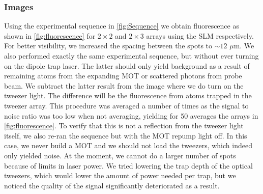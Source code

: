 \subsubsection*{Images}

Using the experimental sequence in \cref{fig:Sequence} we obtain fluorescence as shown in \cref{fig:fluorescence} for $2\times2$ and $2\times3$ arrays using the SLM respectively.
For better visibility, we increased the spacing between the spots to $\sim 12$ $\mu$m.
We also performed exactly the same experimental sequence, but without ever turning on the dipole trap laser. 
The latter should only yield background as a result of remaining atoms from the expanding MOT or scattered photons from probe beam.
We subtract the latter result from the image where we do turn on the tweezer light.
The difference will be the fluorescence from atoms trapped in the tweezer array. 
This procedure was averaged a number of times as the signal to noise ratio was too low when not averaging, yielding for 50 averages the arrays in \cref{fig:fluorescence}.
To verify that this is not a reflection from the tweezer light itself, we also re-ran the sequence but with the MOT repump light off.
In this case, we never build a MOT and we should not load the tweezers, which indeed only yielded noise.
At the moment, we cannot do a larger number of spots because of limits in laser power.
We tried lowering the trap depth of the optical tweezers, which would lower the amount of power needed per trap, but we noticed the quality of the signal significantly deteriorated as a result. 


